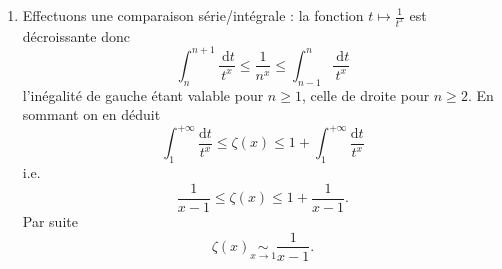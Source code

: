 \begin{enumerate}
$$
\displaystyle\lim _{x \rightarrow+\infty} \zeta(x)=\displaystyle\sum_{n=1}^{+\infty} 
\displaystyle\lim _{x \rightarrow+\infty} \displaystyle\frac{1}{n^x}=1+0+0+\cdots=1.
$$

%
%
%
%
%

\item
Effectuons une comparaison série/intégrale : la fonction $t \mapsto \displaystyle\frac{1}{t^x}$ est décroissante donc
$$
\displaystyle\int_n^{n+1} \displaystyle\frac{\mathrm{~d} t}{t^x} \leqslant 
\displaystyle\frac{1}{n^x} \leqslant \displaystyle\int_{n-1}^n 
\displaystyle\frac{\mathrm{~d} t}{t^x}
$$
l'inégalité de gauche étant valable pour $n\geq1$, celle de droite pour $n\geq 2$. En sommant on en déduit
$$
\displaystyle\int_1^{+\infty} \displaystyle\frac{\mathrm{d} t}{t^x} \leqslant \zeta(x) 
\leqslant 1+\displaystyle\int_1^{+\infty} \displaystyle\frac{\mathrm{d} t}{t^x}
$$
i.e.
$$
\displaystyle\frac{1}{x-1} \leqslant \zeta(x) \leqslant 1+\displaystyle\frac{1}{x-1}.
$$
Par suite
$$
\zeta(x) \underset{x \rightarrow 1}{\sim} \displaystyle\frac{1}{x-1}.
$$
\end{enumerate}
